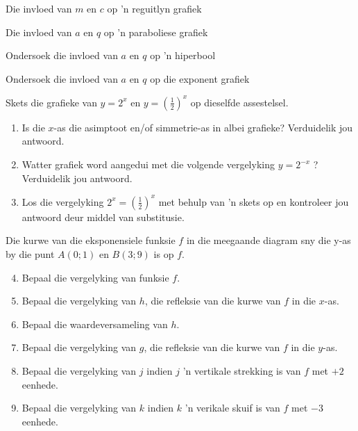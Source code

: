 \begin{Ondersoek}{Die invloed van $m$ en $c$ op 'n reguitlyn grafiek}
\begin{Ondersoek}{Die invloed van $a$ en $q$ op 'n paraboliese grafiek}
\begin{Ondersoek}{Ondersoek die invloed van $a$ en $q$ op 'n hiperbool}
\begin{Ondersoek}{Ondersoek die invloed van $a$ en $q$ op die exponent grafiek}
\begin{exercises}{ }
{Skets die grafieke van $y=2^{x}$ en $y=(\frac{1}{2})^{x}$ op dieselfde assestelsel.
\begin{enumerate}[noitemsep, label=\textbf{\arabic*}. ] 
\item Is die $x$-as die asimptoot en/of simmetrie-as in albei grafieke? Verduidelik jou antwoord.
\item Watter grafiek word aangedui met die volgende vergelyking $y=2^{-x}$ ? Verduidelik jou antwoord.
\item Los die vergelyking $2^{x}=(\frac{1}{2})^{x}$ met behulp van ’n skets op en kontroleer jou antwoord deur middel van substitusie.
\end{enumerate}
Die kurwe van die eksponensiele funksie $f$ in die meegaande diagram sny die y-as by die punt $A(0; 1)$ en $B(3; 9)$ is op $f$.
\begin{enumerate}[noitemsep, label=\textbf{\arabic*}. ] 
\setcounter{enumi}{3}
\item  Bepaal die vergelyking van funksie $f$.
\item  Bepaal die vergelyking van $h$, die refleksie van die kurwe van $f$ in die $x$-as.
\item  Bepaal die waardeversameling van $h$.
\item Bepaal die vergelyking van  $g$, die refleksie van die kurwe van $f$ in die $y$-as.
\item Bepaal die vergelyking van $j$ indien $j$ 'n vertikale strekking is van $f$ met $+2$ eenhede.
\item Bepaal die vergelyking van $k$ indien $k$ 'n verikale skuif is van $f$ met $-3$ eenhede.
\end{enumerate}


}
\end{exercises}


\end{Ondersoek}
\end{Ondersoek}
\end{Ondersoek}
\end{Ondersoek}

